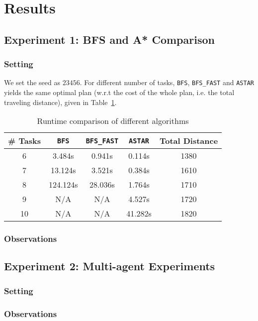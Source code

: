 \documentclass[11pt]{article}
\begin{document}
\section{Results}

\subsection{Experiment 1: BFS and A* Comparison}

\subsubsection{Setting}
We set the seed as $23456$. For different number of tasks, \texttt{BFS}, \texttt{BFS\_FAST} and \texttt{ASTAR} yields the same optimal plan (w.r.t the cost of the whole plan, i.e. the total traveling distance), given in Table~\ref{tab:my-table}.
\begin{table}[]
\begin{center}
\begin{tabular}{|c|c|c|c|c|}
\hline
 \# Tasks	&\texttt{BFS}		&\texttt{BFS\_FAST}	&\texttt{ASTAR}		&Total Distance  \\ \hline
 6	&3.484s	&0.941s	&0.114s  &1380  \\ \hline
 7	&13.124s		&3.521s	&0.384s  &1610  \\ \hline
 8	&124.124s  &28.036s	&1.764s  &1710  \\ \hline
 9	&N/A  &N/A  &4.527s  &1720  \\ \hline
 10	&N/A  &N/A  &41.282s  &1820  \\ \hline
\end{tabular}
\caption{Runtime comparison of different algorithms}
\label{tab:my-table}
\end{center}
\end{table}

\subsubsection{Observations}


\subsection{Experiment 2: Multi-agent Experiments}

\subsubsection{Setting}

\subsubsection{Observations}
\end{document}
